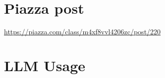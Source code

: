 \newpage

\section{Piazza post}

\url{https://piazza.com/class/m4xf8vvl4206zc/post/220}

\section{LLM Usage}



